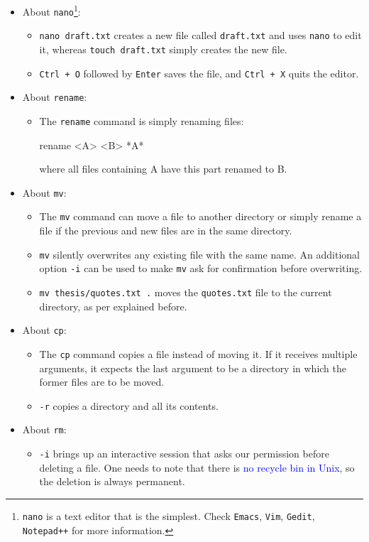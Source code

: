 \documentclass[UTF8]{book}
\newcommand{\code}[1]{\colorbox{codegray}{\texttt{#1}}}
\begin{document}
\begin{itemize}
\begin{itemize}
\end{itemize}
\item About \code{nano}\footnote{\code{nano} is a text editor that is the simplest. Check \code{Emacs}, \code{Vim}, \code{Gedit}, \code{Notepad++} for more information.}:
\begin{itemize}
	\item \code{nano draft.txt} creates a new file called \code{draft.txt} and uses \code{nano} to edit it, whereas \code{touch draft.txt} simply creates the new file.
	\item \code{Ctrl + O} followed by \code{Enter} saves the file, and \code{Ctrl + X} quits the editor.
\end{itemize}
\item About \code{rename}:
\begin{itemize}
	\item The \code{rename} command is simply renaming files:
	\begin{bash}
rename <A> <B> *A*
	\end{bash}
	where all files containing A have this part renamed to B. 
\end{itemize}
\item About \code{mv}:
\begin{itemize}
	\item The \code{mv} command can move a file to another directory or simply rename a file if the previous and new files are in the same directory.
	\item \code{mv} silently overwrites any existing file with the same name. An additional option \code{-i} can be used to make \code{mv} ask for confirmation before overwriting.
	\item \code{mv thesis/quotes.txt .} moves the \code{quotes.txt} file to the current directory, as per explained before.
\end{itemize}
\item About \code{cp}:
\begin{itemize}
	\item The \code{cp} command copies a file instead of moving it. If it receives multiple arguments, it expects the last argument to be a directory in which the former files are to be moved.
	\item \code{-r} copies a directory and all its contents.
\end{itemize}
\item About \code{rm}:
\begin{itemize}
	\item \code{-i} brings up an interactive session that asks our permission before deleting a file. One needs to note that there is \textcolor{blue}{no recycle bin in Unix}, so the deletion is always permanent.

\end{itemize}
\end{itemize}
\end{document}
